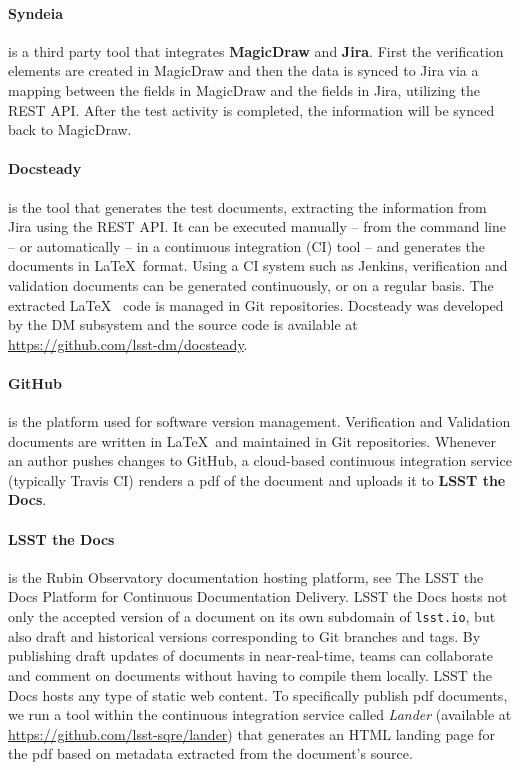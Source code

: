 \paragraph{Syndeia}
is a third party tool that integrates \textbf{MagicDraw} and \textbf{Jira}. 
First the verification elements are created in MagicDraw and then the data is synced to Jira
via a mapping between the fields in MagicDraw and the fields in Jira, utilizing the REST API.
After the test activity is completed, the information will be synced back to MagicDraw.

\paragraph{Docsteady}
is the tool that generates the test documents, extracting the information from Jira using the REST API.
It can be executed manually -- from the command line -- or automatically -- in a continuous integration (CI) tool --
and generates the documents in \LaTeX~format.
Using a CI system such as Jenkins, verification and validation documents can be generated continuously, or on a regular basis.
The extracted \LaTeX~ code is managed in Git repositories.
Docsteady was developed by the DM subsystem and the source code is available at \url{https://github.com/lsst-dm/docsteady}.

\paragraph{GitHub}
is the platform used for software version management.
Verification and Validation documents are written in \LaTeX~and maintained in Git repositories.
Whenever an author pushes changes to GitHub, a cloud-based continuous integration service 
(typically Travis CI) renders a pdf of the document and uploads it to \textbf{LSST the Docs}.

\paragraph{LSST the Docs}
is the Rubin Observatory documentation hosting platform, see The LSST the Docs Platform for Continuous Documentation Delivery\cite{SQR-006}.
LSST the Docs hosts not only the accepted version of a document on its own subdomain of \texttt{lsst.io}, but also draft and
historical versions corresponding to Git branches and tags.
By publishing draft updates of documents in near-real-time, teams can collaborate and comment on documents without having to
compile them locally.
LSST the Docs hosts any type of static web content.
To specifically publish pdf documents, we run a tool within the continuous integration service called \textit{Lander}
(available at \url{https://github.com/lsst-sqre/lander})
that generates an HTML landing page for the pdf based on metadata extracted from the document's source.

